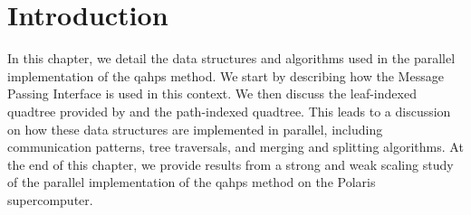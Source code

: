 \section{Introduction}

In this chapter, we detail the data structures and algorithms used in the parallel implementation of the \gls{qahps} method. We start by describing how the Message Passing Interface is used in this context. We then discuss the leaf-indexed quadtree provided by \pforest and the path-indexed quadtree. This leads to a discussion on how these data structures are implemented in parallel, including communication patterns, tree traversals, and merging and splitting algorithms. At the end of this chapter, we provide results from a strong and weak scaling study of the parallel implementation of the \gls{qahps} method on the Polaris supercomputer.



